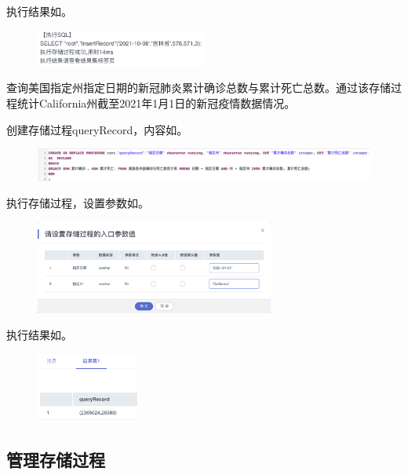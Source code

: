 \documentclass[lang=cn,11pt,a4paper,cite=authornum]{paper}
\begin{document}
执行结果如。
\begin{figure}[!htb]
    \centering
    \includegraphics[width=0.5\textwidth]{./images/res27.png}
    \caption{\label{fig:res27}}
\end{figure}

查询美国指定州指定日期的新冠肺炎累计确诊总数与累计死亡总数。通过该存储过程统计California州截至2021年1月1日的新冠疫情数据情况。

创建存储过程queryRecord，内容如。
\begin{figure}[!htb]
    \centering
    \includegraphics[width=\textwidth]{./images/res28.png}
    \caption{\label{fig:res28}}
\end{figure}

执行存储过程，设置参数如。
\begin{figure}[!htb]
    \centering
    \includegraphics[width=0.7\textwidth]{./images/res29.png}
    \caption{\label{fig:res29}}
\end{figure}

执行结果如。
\begin{figure}[!htb]
    \centering
    \includegraphics[width=0.3\textwidth]{./images/res30.png}
    \caption{\label{fig:res30}}
\end{figure}

\subsection{管理存储过程}
\end{document}
